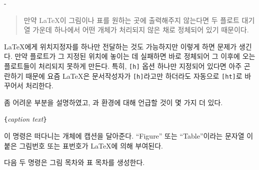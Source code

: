 \begin{adjustwidth}{0pt}{-\margheadwidth}
\begin{quote}
  만약 \LaTeX 이 그림이나 표를 원하는 곳에 출력해주지 않는다면
  두 플로트 대기열 가운데 하나에서 어떤 개체가 처리되지 않은 채로 정체되어 있기 때문이다.
\end{quote}


\LaTeX 에게 위치지정자를 하나만 전달하는 것도 가능하지만 이렇게 하면 문제가 생긴다.
만약 플로트가 그 지정된 위치에 놓이는 데 실패하면 바로 정체되어 그 이후에 오는 플로트들이
처리되지 못하게 만든다.
특히, \texttt{[h]} 옵션 하나만 지정되어 있다면 아주 곤란하기 때문에 요즘 \LaTeX 은 문서작성자가 
\texttt{[h]}라고만 하더라도 자동으로 \texttt{[ht]}로 바꾸어서 처리한다.

\bigskip
\noindent 좀 어려운 부분을 설명하였고, 과  환경에 대해 
언급할 것이 몇 가지 더 있다.

\begin{lscommand}
\verb|{|\emph{caption text}\verb|}|
\end{lscommand}
\noindent 이 명령은 떠다니는 개체에 캡션을 달아준다. ``Figure'' 또는 ``Table''이라는 
문자열%
이 붙은 그림번호 또는 표번호가 \LaTeX 에 의해 부여된다.

\bigskip

다음 두 명령은 그림 목차와 표 목차를 생성한다.

\begin{lscommand}
 
\end{lscommand}


\end{adjustwidth}
